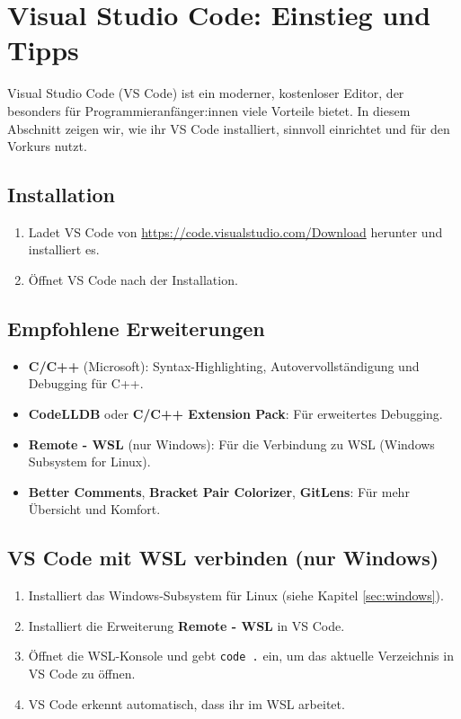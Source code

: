 \chapter{Visual Studio Code: Einstieg und Tipps}
\label{sec:vscode}

Visual Studio Code (VS Code) ist ein moderner, kostenloser Editor, der besonders für Programmieranfänger:innen viele Vorteile bietet.
In diesem Abschnitt zeigen wir, wie ihr VS Code installiert, sinnvoll einrichtet und für den Vorkurs nutzt.

\section{Installation}
\begin{enumerate}
	\item Ladet VS Code von \url{https://code.visualstudio.com/Download} herunter und installiert es.
	\item Öffnet VS Code nach der Installation.
\end{enumerate}

\section{Empfohlene Erweiterungen}
\begin{itemize}
	\item \textbf{C/C++} (Microsoft): Syntax-Highlighting, Autovervollständigung und Debugging für C++.
	\item \textbf{CodeLLDB} oder \textbf{C/C++ Extension Pack}: Für erweitertes Debugging.
	\item \textbf{Remote - WSL} (nur Windows): Für die Verbindung zu WSL (Windows Subsystem for Linux).
	\item \textbf{Better Comments}, \textbf{Bracket Pair Colorizer}, \textbf{GitLens}: Für mehr Übersicht und Komfort.
\end{itemize}

\section{VS Code mit WSL verbinden (nur Windows)}
\begin{enumerate}
	\item Installiert das Windows-Subsystem für Linux (siehe Kapitel \ref{sec:windows}).
	\item Installiert die Erweiterung \textbf{Remote - WSL} in VS Code.
	\item Öffnet die WSL-Konsole und gebt \texttt{code .} ein, um das aktuelle Verzeichnis in VS Code zu öffnen.
	\item VS Code erkennt automatisch, dass ihr im WSL arbeitet.
\end{enumerate}

